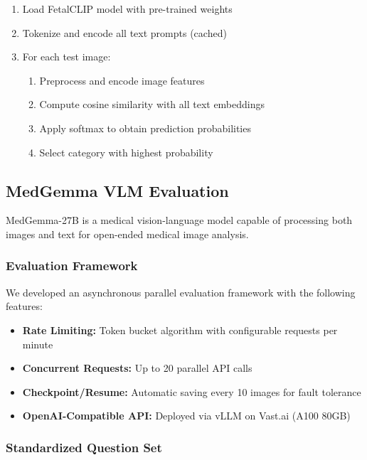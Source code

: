 \documentclass[11pt,a4paper]{article}
\begin{document}
\begin{enumerate}
    \item Load FetalCLIP model with pre-trained weights
    \item Tokenize and encode all text prompts (cached)
    \item For each test image:
    \begin{enumerate}
        \item Preprocess and encode image features
        \item Compute cosine similarity with all text embeddings
        \item Apply softmax to obtain prediction probabilities
        \item Select category with highest probability
    \end{enumerate}
\end{enumerate}

\subsection{MedGemma VLM Evaluation}

MedGemma-27B is a medical vision-language model capable of processing both images and text for open-ended medical image analysis.

\subsubsection{Evaluation Framework}

We developed an asynchronous parallel evaluation framework with the following features:

\begin{itemize}
    \item \textbf{Rate Limiting:} Token bucket algorithm with configurable requests per minute
    \item \textbf{Concurrent Requests:} Up to 20 parallel API calls
    \item \textbf{Checkpoint/Resume:} Automatic saving every 10 images for fault tolerance
    \item \textbf{OpenAI-Compatible API:} Deployed via vLLM on Vast.ai (A100 80GB)
\end{itemize}

\subsubsection{Standardized Question Set}
\end{document}
